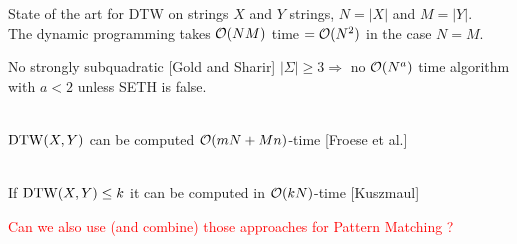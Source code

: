   \begin{frame}{State of the art for DTW on strings}
    $X$ and $Y$ strings, $N=|X|$ and $M=|Y|$.
    \\
    \smallskip
    The dynamic programming takes $\mathcal{O}(NM)$ time $=\mathcal{O}(N^2)$ in the case $N=M$.\\ \pause
    \begin{block}{No strongly subquadratic [Gold and Sharir]}
    $|\Sigma| \geq 3 \Rightarrow $ no $\mathcal{O}(N^{a})$ time algorithm with $a<2$ unless SETH is false.
    \end{block}\pause

     \\
    $\mathrm{DTW}(X,Y)$ can be computed $\mathcal{O}(mN+Mn)$-time [Froese et al.] 
    
    \smallskip
    \\
    If $\mathrm{DTW}(X,Y) \leq k$ it can be computed in $\mathcal{O}(kN)$-time [Kuszmaul]
    
    \medskip

    \textcolor{red}{Can we also use (and combine) those approaches for Pattern Matching ?}

\end{frame}

